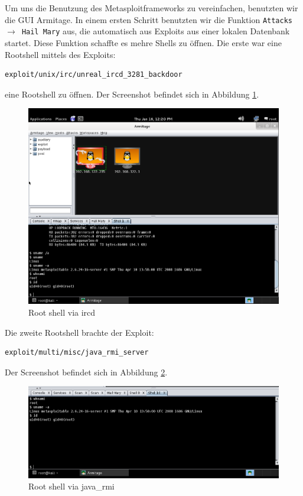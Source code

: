 \documentclass[10pt,a4paper]{article}
\begin{document}
Um uns die Benutzung des Metasploitframeworks zu vereinfachen, benutzten wir die GUI Armitage. In einem ersten Schritt benutzten wir die Funktion \texttt{Attacks $\rightarrow$ Hail Mary} aus, die automatisch aus Exploits aus einer lokalen Datenbank startet. Diese Funktion schaffte es mehre Shells zu öffnen. 
Die erste war eine Rootshell mittels des Exploits:
\begin{verbatim}
exploit/unix/irc/unreal_ircd_3281_backdoor
\end{verbatim}
eine Rootshell zu öffnen. Der Screenshot befindet sich in Abbildung \ref{ircd_root}.
\begin{figure}
\includegraphics[scale=0.5]{figures/ircd_rootshell.png}
\caption{Root shell via ircd}
\label{ircd_root}
\end{figure}

Die zweite Rootshell brachte der Exploit:
\begin{verbatim}
exploit/multi/misc/java_rmi_server
\end{verbatim}
Der Screenshot befindet sich in Abbildung \ref{java_rmi}.
\begin{figure}
\includegraphics[scale=0.5]{figures/java_rmi.png}
\caption{Root shell via java\_rmi}
\label{java_rmi}
\end{figure}
\end{document}
